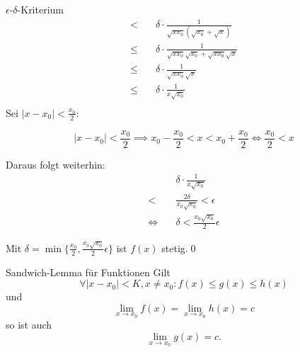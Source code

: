 \documentclass[german]{../spicker}
\renewcommand{\abs}[1]{\left| #1 \right|}
\begin{document}
\begin{example}{$\epsilon$-$\delta$-Kriterium}
$$\begin{aligned}
            < \quad    & \delta \cdot \frac{1 }{ \sqrt{x x_0 } \left( \sqrt{x_0} + \sqrt{x} \right) }                                                                             \\
            \leq \quad & \delta \cdot \frac{1 }{ \sqrt{x x_0 } \sqrt{x_0} + \sqrt{x x_0 } \sqrt{x} }                                                                              \\
            \leq \quad & \delta \cdot \frac{1 }{ \sqrt{x x_0 } \sqrt{x} }                                                                                                         \\
            \leq \quad & \delta \cdot \frac{1 }{ x\sqrt{x_0} }                                                                                                                    \\
        \end{aligned}
    $$
    Sei $\abs{x-x_0} < \frac{x_0}{2}$:

    $$\abs{x-x_0} < \frac{x_0}{2} \implies x_0 -\frac{x_0}{2}  < x < x_0 + \frac{x_0}{2}  \iff \frac{x_0}{2} < x$$

    Daraus folgt weiterhin:
    $$
        \begin{aligned}
                       & \delta \cdot \frac{1 }{ x\sqrt{x_0} }       \\
            < \quad    & \frac{2\delta }{ x_0\sqrt{x_0} } < \epsilon \\
            \iff \quad & \delta < \frac{x_0\sqrt{x_0}}{2} \epsilon
        \end{aligned}
    $$

    Mit $\delta = \min\{\frac{x_0}{2}, \frac{x_0\sqrt{x_0}}{2}\epsilon\}$ ist $f(x)$ stetig.\qed
\end{example}

\begin{defi}{Sandwich-Lemma für Funktionen}
    Gilt
    $$
        \forall \abs{x-x_0} < K, x\neq x_0 : f(x) \leq g(x) \leq h(x)
    $$
    und
    $$
        \lim_{x\to x_0} f(x) = \lim_{x\to x_0} h(x) = c
    $$
    so ist auch
    $$
        \lim_{x\to x_0} g(x) = c.
    $$
\end{defi}
\end{document}
